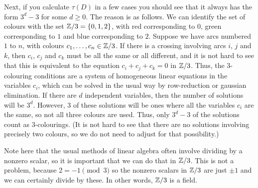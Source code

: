 \documentclass[a4paper]{amsart}
\begin{document}
\begin{solution}
\begin{enumerate}
   Next, if you calculate $\tau(D)$ in a few cases you should see that
   it always has the form $3^d-3$ for some $d\geq 0$.  The reason is
   as follows.  We can identify the set of colours with the set
   $\mathbb{Z}/3=\{0,1,2\}$, with red corresponding to $0$, green
   corresponding to $1$ and blue corresponding to $2$.  Suppose we
   have arcs numbered $1$ to $n$, with colours
   $c_1,\dotsc,c_n\in\mathbb{Z}/3$.  If there is a crossing involving arcs
   $i$, $j$ and $k$, then $c_i$, $c_j$ and $c_k$ must be all the same
   or all different, and it is not hard to see that this is equivalent
   to the equation $c_i+c_j+c_k=0$ in $\mathbb{Z}/3$.  Thus, the $3$-colouring
   conditions are a system of homogeneous linear equations in the
   variables $c_i$, which can be solved in the usual way by
   row-reduction or gaussian elimination.  If there are $d$
   independent variables, then the number of solutions will be $3^d$.
   However, $3$ of these solutions will be ones where all the
   variables $c_i$ are the same, so not all three colours are used.
   Thus, only $3^d-3$ of the solutions count as $3$-colourings.  (It
   is not hard to see that there are no solutions involving precisely
   two colours, so we do not need to adjust for that possibility.)

   Note here that the usual methods of linear algebra often involve
   dividing by a nonzero scalar, so it is important that we can do
   that in $\mathbb{Z}/3$.  This is not a problem, because $2=-1\pmod{3}$ so
   the nonzero scalars in $\mathbb{Z}/3$ are just $\pm 1$ and we can certainly
   divide by these.  In other words, $\mathbb{Z}/3$ is a field.
 \end{enumerate}
\end{solution}
\end{document}
